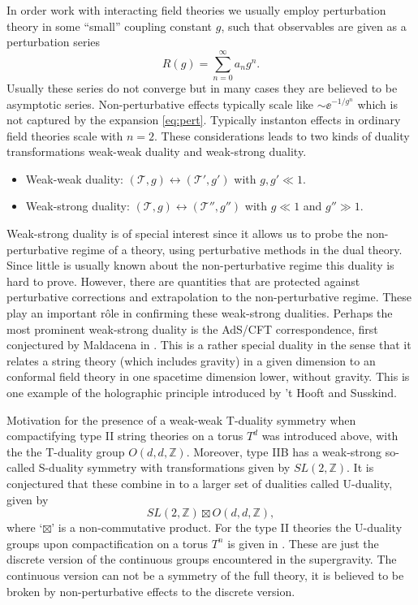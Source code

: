 In order work with interacting field theories we usually employ perturbation theory in some ``small'' coupling constant $g$, such that observables are given as a perturbation series 
\begin{equation}\label{eq:pert}
    R(g) = \sum_{n=0}^{\infty}a_n g^n.
\end{equation}
Usually these series do not converge but in many cases they are believed to be asymptotic series. Non-perturbative effects typically scale like $\sim \ee^{-1/g^n}$ which is not captured by the expansion \eqref{eq:pert}. Typically instanton effects in ordinary field theories scale with $n=2$. These considerations leads to two kinds of duality transformations weak-weak duality and weak-strong duality. 
\begin{itemize}
    \item Weak-weak duality: $\left(\mathscr{T},g\right)\leftrightarrow\left(\mathscr{T}',g'\right)$ with $g,g'\ll 1$.
    \item Weak-strong duality: $\left(\mathscr{T},g\right)\leftrightarrow\left(\mathscr{T}'',g''\right)$ with $g\ll 1$ and $g''\gg 1$.
\end{itemize}
Weak-strong duality is of special interest since it allows us to probe the non-perturbative regime of a theory, using perturbative methods in the dual theory. Since little is usually known about the non-perturbative regime this duality is hard to prove. However, there are quantities that are protected against perturbative corrections and extrapolation to the non-perturbative regime. These play an important rôle in confirming these weak-strong dualities. Perhaps the most prominent weak-strong duality is the AdS/CFT correspondence, first conjectured by Maldacena in \cite{Maldacena1999}. This is a rather special duality in the sense that it relates a string theory (which includes gravity) in a given dimension to an conformal field theory in one spacetime dimension lower, without gravity. This is one example of the holographic principle introduced by 't Hooft and Susskind.

Motivation for the presence of a weak-weak T-duality symmetry when compactifying type II string theories on a torus $T^d$ was introduced above, with the the T-duality group $O(d,d,\mathbb{Z})$. Moreover, type IIB has a weak-strong so-called S-duality symmetry with transformations given by $SL(2,\mathbb{Z})$. It is conjectured that these combine in to a larger set of dualities called U-duality, given by 
\begin{equation}
    SL(2,\mathbb{Z})\boxtimes O(d,d,\mathbb{Z}),
\end{equation}
where `$\boxtimes$' is a non-commutative product. For the type II theories the U-duality groups upon compactification on a torus $T^{n}$ is given in . These are just the discrete version of the continuous groups encountered in the supergravity. The continuous version can not be a symmetry of the full theory, it is believed to be broken by non-perturbative effects to the discrete version. 

